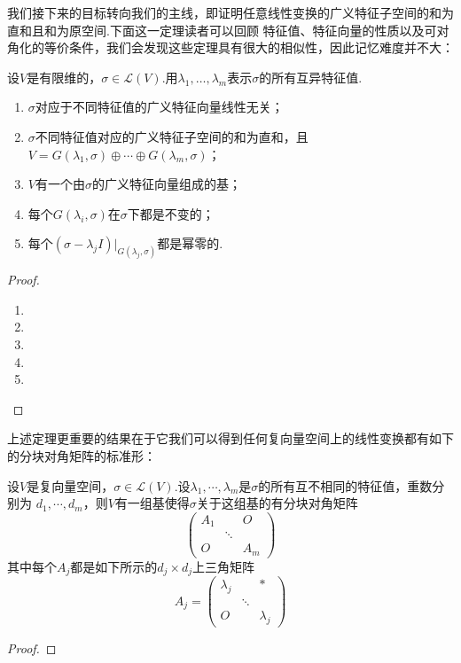 我们接下来的目标转向我们的主线，即证明任意线性变换的广义特征子空间的和为直和且和为原空间.下面这一定理读者可以回顾
特征值、特征向量的性质以及可对角化的等价条件，我们会发现这些定理具有很大的相似性，因此记忆难度并不大：
\begin{theorem} \label{thm:19:广义特征性质}
    设$V$是有限维的，$\sigma\in \mathcal{L}(V)$.用$\lambda_1,\ldots,\lambda_m$表示$\sigma$的所有互异特征值.
    \begin{enumerate}[label=(\arabic*)]
        \item $\sigma$对应于不同特征值的广义特征向量线性无关；

        \item $\sigma$不同特征值对应的广义特征子空间的和为直和，且$V=G(\lambda_1,\sigma)\oplus\cdots\oplus
        G(\lambda_m,\sigma)$；

        \item $V$有一个由$\sigma$的广义特征向量组成的基；

        \item 每个$G(\lambda_i,\sigma)$在$\sigma$下都是不变的；

        \item 每个$(\sigma-\lambda_j I)\vert_{G(\lambda_j,\sigma)}$都是幂零的.
    \end{enumerate}
\end{theorem}
\begin{proof}
    \begin{enumerate}[label=(\arabic*)]
        \item 
        \item 
        \item 
        \item 
        \item 
    \end{enumerate}
\end{proof}

上述定理更重要的结果在于它我们可以得到任何复向量空间上的线性变换都有如下的分块对角矩阵的标准形：
\begin{theorem}
    设$V$是复向量空间，$\sigma\in \mathcal{L}(V)$.设$\lambda_1,\cdots,\lambda_m$是$\sigma$的所有互不相同的特征值，重数分别为
    $d_1,\cdots,d_m$，则$V$有一组基使得$\sigma$关于这组基的有分块对角矩阵
    \[\begin{pmatrix}
        A_1 &  & O \\  & \ddots &  \\ O &  & A_m
    \end{pmatrix}\]
    其中每个$A_j$都是如下所示的$d_j\times d_j$上三角矩阵
    \[A_j=\begin{pmatrix}
        \lambda_j &  & * \\  & \ddots &  \\ O &  & \lambda_j
    \end{pmatrix}\]
\end{theorem}
\begin{proof}
    
\end{proof}

